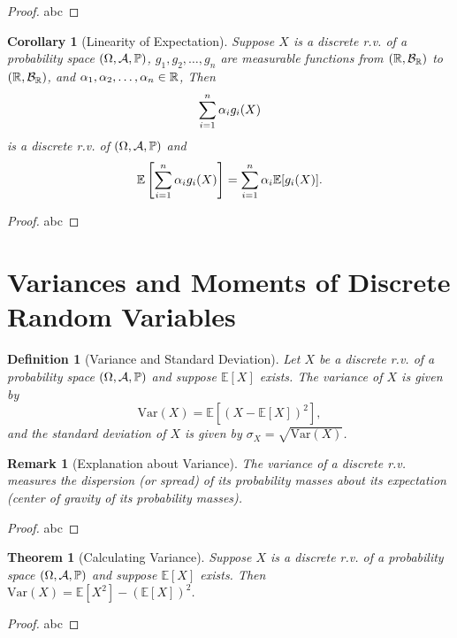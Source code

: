 \documentclass[openany,12pt]{book}
\newtheorem{theorem}{Theorem}[chapter]
\newtheorem{corollary}{Corollary}[chapter]
\newtheorem{remark}{Remark}[chapter]
\newtheorem{definition}{Definition}[chapter]
\begin{document}
\begin{proof}
  abc
\end{proof}

\begin{corollary}[Linearity of Expectation]
  Suppose $X$ is a discrete r.v. of a probability space $(\Omega,\mathcal{A},\mathbb{P})$,
  $g_1,g_2, \dots,g_n$ are measurable functions from $(\mathbb{R},\mathcal{B}_{\mathbb{R}})$ to $(\mathbb{R},\mathcal{B}_{\mathbb{R}})$, and $\alpha_1,\alpha_2, \dots,\alpha_n\in\mathbb{R}$, Then
  $$
    \sum_{i=1}^{n}\alpha_i  g_i (X)
  $$
  is a discrete r.v. of $(\Omega,\mathcal{A},\mathbb{P})$ and
  $$
    \mathbb{E}\left[\sum_{i=1}^{n}\alpha_i  g_i (X)\right]=\sum_{i=1}^{n}\alpha_i  \mathbb{E}[g_i (X)].
  $$
\end{corollary}

\begin{proof}
  abc
\end{proof}

\section{Variances and Moments of Discrete Random Variables}

\begin{definition}[Variance and Standard Deviation]
  Let $X$ be a discrete r.v. of a probability space $(\Omega,\mathcal{A},\mathbb{P})$ and suppose $\mathbb{E}[X]$ exists. The variance of $X$ is given by $$\mathrm{Var}(X)=\mathbb{E}[(X-\mathbb{E}[X])^2],$$ and the standard deviation of $X$ is given by $\sigma_X=\sqrt{\mathrm{Var}(X)}$.
\end{definition}

\begin{remark}[Explanation about Variance]
  The variance of a discrete r.v. measures the dispersion (or spread) of its probability masses about its expectation (center of gravity of its probability masses).
\end{remark}

\begin{proof}
  abc
\end{proof}

\begin{theorem}[Calculating Variance]
  Suppose $X$ is a discrete r.v. of a probability space $(\Omega,\mathcal{A},\mathbb{P})$ and suppose $\mathbb{E}[X]$ exists. Then $\mathrm{Var}(X)=\mathbb{E}[X^2]-(\mathbb{E}[X])^2$.
\end{theorem}

\begin{proof}
  abc
\end{proof}
\end{document}
